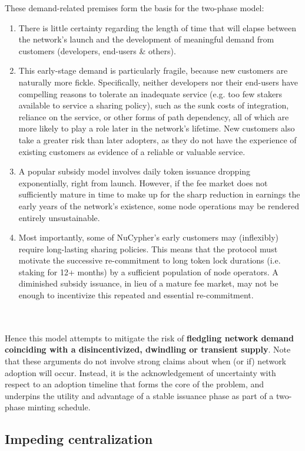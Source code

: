 \documentclass[8pt]{article}
\begin{document}
These demand-related premises form the basis for the two-phase model: 
\begin{enumerate}
\item There is little certainty regarding the length of time that will elapse between the network's launch and the development of meaningful demand from customers (developers, end-users \& others).
\item This early-stage demand is particularly fragile, because new customers are naturally more fickle. Specifically, neither developers nor their end-users have compelling reasons to tolerate an inadequate service (e.g. too few stakers available to service a sharing policy), such as the sunk costs of integration, reliance on the service, or other forms of path dependency, all of which are more likely to play a role later in the network's lifetime. New customers also take a greater risk than later adopters, as they do not have the experience of existing customers as evidence of a reliable or valuable service.
\item A popular subsidy model involves daily token issuance dropping exponentially, right from launch. However, if the fee market does not sufficiently mature in time to make up for the sharp reduction in earnings the early years of the network's existence, some node operations may be rendered entirely unsustainable. 
\item Most importantly, some of NuCypher's early customers may (inflexibly) require long-lasting sharing policies. This means that the protocol must motivate the successive re-commitment to long token lock durations (i.e. staking for 12+ months) by a sufficient population of node operators. A diminished subsidy issuance, in lieu of a mature fee market, may not be enough to incentivize this repeated and essential re-commitment. 
\end{enumerate}

\\\\
Hence this model attempts to mitigate the risk of \textbf{fledgling network demand coinciding with a disincentivized, dwindling or transient supply}. Note that these arguments do not involve strong claims about when (or if) network adoption will occur. Instead, it is the acknowledgement of uncertainty with respect to an adoption timeline that forms the core of the problem, and underpins the utility and advantage of a stable issuance phase as part of a two-phase minting schedule. 

\subsection{Impeding centralization}
\end{document}
